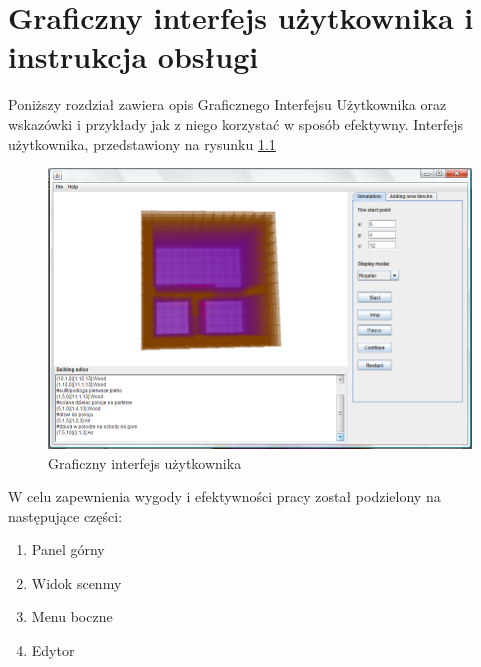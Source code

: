 ﻿\chapter {Graficzny interfejs użytkownika i instrukcja obsługi}
\label{cha:gui}
Poniższy rozdział zawiera opis Graficznego Interfejsu Użytkownika oraz wskazówki i przykłady jak z niego korzystać
w sposób efektywny.
Interfejs użytkownika, przedstawiony na rysunku \ref{gui_cale} 
\begin{figure}
\begin{center}
\includegraphics{gui_cale.png} 
\caption { Graficzny interfejs użytkownika}
\label {gui_cale}
\end{center}
\end{figure}
W celu zapewnienia wygody i efektywności pracy został podzielony na następujące części:
\begin {enumerate}
\item Panel górny
\item Widok scenmy
\item Menu boczne
\item Edytor
\end {enumerate}
